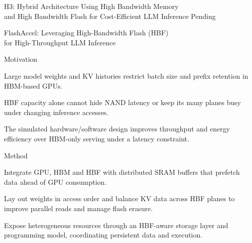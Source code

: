 \begin{frame}[c]{H3: Hybrid Architecture Using High Bandwidth Memory\\and High Bandwidth Flash for Cost-Efficient LLM Inference}
\centering
{\Large\color{Muted}Pending}
\end{frame}
\begin{frame}[t]{FlashAccel: Leveraging High-Bandwidth Flash (HBF)\\for High-Throughput LLM Inference}
\vspace{.02cm}
\begin{minipage}[t][3.25cm][t]{\linewidth}
\begin{summarysection}{Motivation}
\item {} Large model weights and KV histories restrict batch size and prefix retention in HBM-based GPUs.
\item {} HBF capacity alone cannot hide NAND latency or keep its many planes busy under changing inference accesses.
\item {} The simulated hardware/software design improves throughput and energy efficiency over HBM-only serving under a latency constraint.
\end{summarysection}
\end{minipage}
\vspace{.18cm}
\begin{summarysection}{Method}
\item {} Integrate GPU, HBM and HBF with distributed SRAM buffers that prefetch data ahead of GPU consumption.
\item {} Lay out weights in access order and balance KV data across HBF planes to improve parallel reads and manage flash erasure.
\item {} Expose heterogeneous resources through an HBF-aware storage layer and programming model, coordinating persistent data and execution.
\end{summarysection}
\end{frame}
